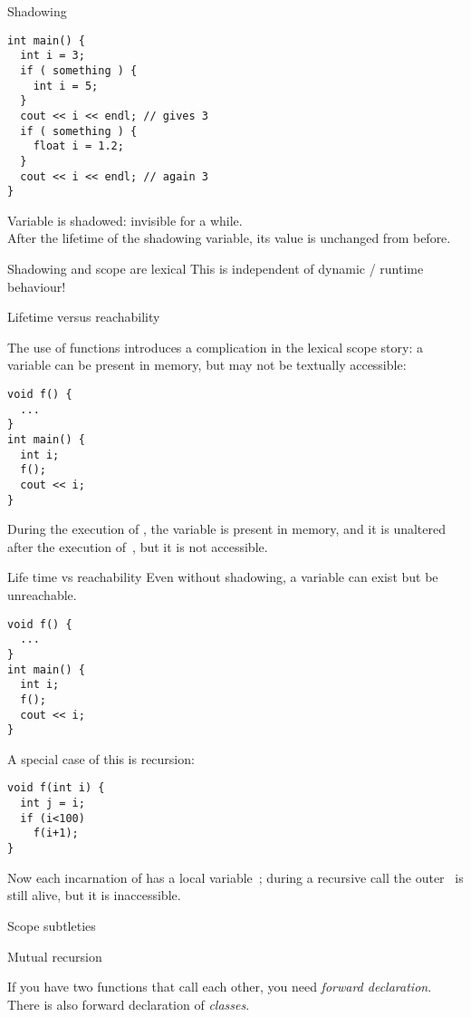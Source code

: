 \begin{slide}{Shadowing}
  \label{sl:scope-shadow}
\begin{verbatim}
int main() {
  int i = 3;
  if ( something ) {
    int i = 5;
  }
  cout << i << endl; // gives 3
  if ( something ) {
    float i = 1.2;
  }
  cout << i << endl; // again 3
}
\end{verbatim}
Variable  is shadowed: invisible for a while.\\
After the lifetime of the shadowing variable, its value is unchanged
from before.
\end{slide}

\begin{block}{Shadowing and scope are lexical}
  \label{sl:scope-shadowfalse}
  This is independent of dynamic / runtime behaviour!
\end{block}

 {Lifetime versus reachability}

The use of functions introduces a complication in the lexical scope story:
a variable can be present in memory, but may not be textually accessible:
\begin{verbatim}
void f() {
  ...
}
int main() {
  int i;
  f();
  cout << i;
}
\end{verbatim}
During the execution of , the variable  is present in
memory, and it is unaltered after the execution of~,
but it is not accessible.

\begin{slide}{Life time vs reachability}
  \label{sl:scope-lifetime}
  Even without shadowing, a variable can exist but be unreachable.
\begin{verbatim}
void f() {
  ...
}
int main() {
  int i;
  f();
  cout << i;
}
\end{verbatim}
\end{slide}

A special case of this is recursion:
\begin{verbatim}
void f(int i) {
  int j = i;
  if (i<100)
    f(i+1);
}
\end{verbatim}
Now each incarnation of  has a local variable~; during a
recursive call the outer~ is still alive, but it is inaccessible.

 {Scope subtleties}

 {Mutual recursion}

If you have two functions  that call each other, you need
%
\emph{forward declaration}.
%
There is also forward declaration of
%
\emph{classes}.

